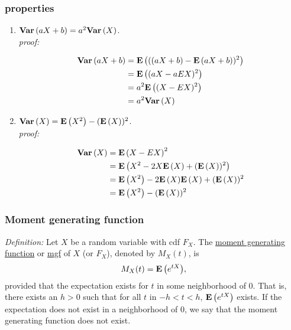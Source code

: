\subsubsection*{properties}
\begin{enumerate}
  \item $\mathbf{Var}\left(aX + b\right) = a^2\mathbf{Var}\left(X\right)$.\\
  {\it proof: }\\
  \begin{pf}
  $$
  \begin{aligned}
  \mathbf{Var}\left(aX + b\right) 
  &= {\mathbf{E}\left(((aX + b) - {\mathbf{E}\left(aX+b\right)})^2\right)}\\
  &= {\mathbf{E}\left((aX - aEX)^2\right)}\\
  &= a^2 {\mathbf{E}\left((X - EX)^2\right)}\\
  &= a^2 \mathbf{Var}\left(X\right)\\
  \end{aligned}
  $$  
  \end{pf}

  \item $\mathbf{Var}\left(X\right) = {\mathbf{E}\left(X^2\right)} - ({\mathbf{E}\left(X\right)})^2$.\\
  {\it proof: }\\
  \begin{pf}
 $$
  \begin{aligned}
  \mathbf{Var}\left(X\right) 
  &= {\mathbf{E}\left(X - EX\right)}^2\\
  &= {\mathbf{E}\left(X^2 - 2X {\mathbf{E}\left(X\right)} + ({\mathbf{E}\left(X\right)})^2\right)}\\
  &= {\mathbf{E}\left(X^2\right)} - 2{\mathbf{E}\left(X\right)} {\mathbf{E}\left(X\right)} + ({\mathbf{E}\left(X\right)})^2\\
  &= {\mathbf{E}\left(X^2\right)} -  ({\mathbf{E}\left(X\right)})^2\\
  \end{aligned}
  $$    
  \end{pf}  
\end{enumerate}

\subsubsection*{Moment generating function}
{\it Definition: } Let $X$ be a random variable with cdf $F_X$.  The \underline{moment generating function} or \underline{mgf} of $X$ (or $F_X$), 
denoted by $M_X(t)$, is
$$
M_X(t) = {\mathbf{E}\left(e^{tX}\right)},
$$
provided that the expectation exists for $t$ in some neighborhood of $0$.  That is, there exists an $h>0$ such that for all $t$ in $-h < t < h$, ${\mathbf{E}\left(e^{tX}\right)}$ exists.
If the expectation does not exist in a neighborhood of $0$, we say that the moment generating function does not exist.

